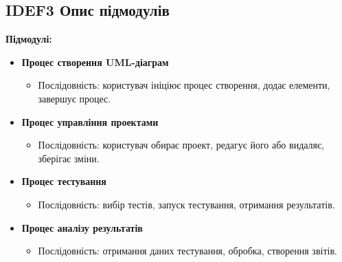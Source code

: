 \documentclass[oneside,14pt]{extarticle}
\begin{document}
\begin{normalsize}
    \subsection*{IDEF3 Опис підмодулів}
    \textbf{Підмодулі:}
    \begin{itemize}
    	\item \textbf{Процес створення UML-діаграм}
    	\begin{itemize}
    		\item Послідовність: користувач ініціює процес створення, додає елементи, завершує процес.
    	\end{itemize}
    	\item \textbf{Процес управління проектами}
    	\begin{itemize}
    		\item Послідовність: користувач обирає проект, редагує його або видаляє, зберігає зміни.
    	\end{itemize}
    	\item \textbf{Процес тестування}
    	\begin{itemize}
    		\item Послідовність: вибір тестів, запуск тестування, отримання результатів.
    	\end{itemize}
    	\item \textbf{Процес аналізу результатів}
    	\begin{itemize}
    		\item Послідовність: отримання даних тестування, обробка, створення звітів.
    	\end{itemize}
    \end{itemize}
    

\end{normalsize}
\end{document}
